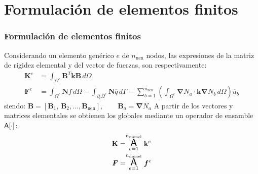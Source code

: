 \documentclass{beamer}
\begin{document}
\section{Formulación de elementos finitos}
\begin{frame}
\frametitle{Formulación de elementos finitos}

Considerando un elemento genérico $e$ de $n_{\textrm{nen}}$ nodos, las
expresiones de la matriz de rigidez elemental y del vector de fuerzas, son
respectivamente:
\begin{align*}
\mathbf{K}^e&=\int_{\Omega^e} \mathbf{B}^T \mathbf{k} \mathbf{B} \, d \Omega \\
\bm{F}^e&=\int_{\Omega^e} \bm{N} f \, d\Omega 
-\int_{\partial_t \Omega^e} \bm{N} \overline{q} \, d\Gamma-
\sum_{b=1}^{n_{\textrm{nen}}} \left(
\int_{\Omega^e} \bm{\nabla} N_a \cdot \bm{k} \bm{\nabla} N_b \, d \Omega \right)
\overline{u}_b
\end{align*}
siendo:
$
\mathbf{B}=\left[
\bm{B}_1,\,\bm{B}_2,\ldots,\bm{B}_{\textrm{nen}}
\right], \qquad
\bm{B}_a=\bm{\nabla}N_a
$
A partir de los vectores y matrices elementales se obtienen los
globales mediante un operador de ensamble ${\Large \bf{\sf A}[\cdot]}$:
\begin{align}
\mathbf{K} &=
\stackrel{{n_{\rm numel}}}{\underset{e=1}{\mbox{\Large{\bf {\sf A}}}}}
\mathbf{k}^e \label{assemK} \\
    \bm{F} &=
\stackrel{{n_{\rm numel}}}{\underset{e=1}{\mbox{\Large{\bf {\sf A}}}}}
\bm{f}^e \label{assemF}
\end{align}
\end{frame}
\end{document}
